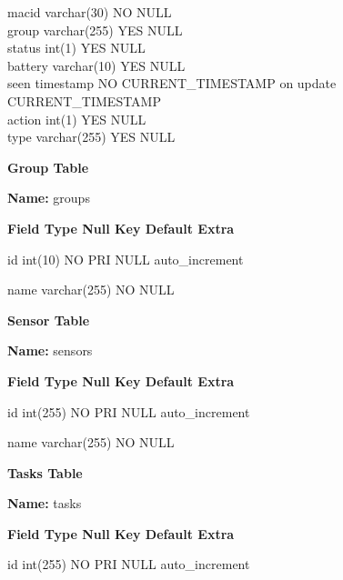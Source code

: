 \documentclass[16pt]{article}
\begin{document}
\textbar{} macid \textbar{} varchar(30) \textbar{} NO \textbar{}
\textbar{} NULL \textbar{} \textbar{}\\ \textbar{} group \textbar{}
varchar(255) \textbar{} YES \textbar{} \textbar{} NULL \textbar{}
\textbar{}\\ \textbar{} status \textbar{} int(1) \textbar{} YES
\textbar{} \textbar{} NULL \textbar{} \textbar{}\\ \textbar{} battery
\textbar{} varchar(10) \textbar{} YES \textbar{} \textbar{} NULL
\textbar{} \textbar{}\\ \textbar{} seen \textbar{} timestamp \textbar{}
NO \textbar{} \textbar{} CURRENT\_TIMESTAMP \textbar{} on update
CURRENT\_TIMESTAMP \textbar{}\\ \textbar{} action \textbar{} int(1)
\textbar{} YES \textbar{} \textbar{} NULL \textbar{} \textbar{}\\
\textbar{} type \textbar{} varchar(255) \textbar{} YES \textbar{}
\textbar{} NULL \textbar{} \textbar{}

\textbf{Group Table}

\textbf{Name:} groups

\textbf{\textbar{} Field \textbar{} Type \textbar{} Null \textbar{} Key
\textbar{} Default \textbar{} Extra \textbar{}}

id \textbar{} int(10) \textbar{} NO \textbar{} PRI \textbar{} NULL
\textbar{} auto\_increment \textbar{}

name \textbar{} varchar(255) \textbar{} NO \textbar{} \textbar{} NULL
\textbar{} \textbar{}

\textbf{Sensor Table}

\textbf{Name:} sensors

\textbf{\textbar{} Field \textbar{} Type \textbar{} Null \textbar{} Key
\textbar{} Default \textbar{} Extra \textbar{}}

id \textbar{} int(255) \textbar{} NO \textbar{} PRI \textbar{} NULL
\textbar{} auto\_increment \textbar{}

name \textbar{} varchar(255) \textbar{} NO \textbar{} \textbar{} NULL
\textbar{}

\textbf{Tasks Table}

\textbf{Name:} tasks

\textbf{\textbar{} Field \textbar{} Type \textbar{} Null \textbar{} Key
\textbar{} Default \textbar{} Extra \textbar{}}

id \textbar{} int(255) \textbar{} NO \textbar{} PRI \textbar{} NULL
\textbar{} auto\_increment \textbar{}
\end{document}
